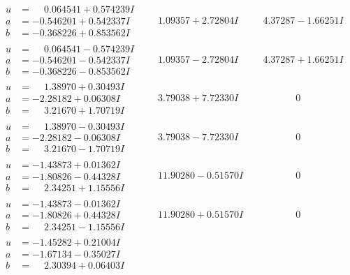 \documentclass[1p]{elsarticle_modified}
\theoremstyle{definition}
\begin{document}
$$\begin{array}{c|c|c}
\begin{aligned}
u &= \phantom{-}0.064541 + 0.574239 I \\
a &= -0.546201 + 0.542337 I \\
b &= -0.368226 + 0.853562 I\end{aligned}
 & \phantom{-}1.09357 + 2.72804 I & \phantom{-}4.37287 - 1.66251 I \\ \hline\begin{aligned}
u &= \phantom{-}0.064541 - 0.574239 I \\
a &= -0.546201 - 0.542337 I \\
b &= -0.368226 - 0.853562 I\end{aligned}
 & \phantom{-}1.09357 - 2.72804 I & \phantom{-}4.37287 + 1.66251 I \\ \hline\begin{aligned}
u &= \phantom{-}1.38970 + 0.30493 I \\
a &= -2.28182 + 0.06308 I \\
b &= \phantom{-}3.21670 + 1.70719 I\end{aligned}
 & \phantom{-}3.79038 + 7.72330 I & \phantom{-0.000000 } 0 \\ \hline\begin{aligned}
u &= \phantom{-}1.38970 - 0.30493 I \\
a &= -2.28182 - 0.06308 I \\
b &= \phantom{-}3.21670 - 1.70719 I\end{aligned}
 & \phantom{-}3.79038 - 7.72330 I & \phantom{-0.000000 } 0 \\ \hline\begin{aligned}
u &= -1.43873 + 0.01362 I \\
a &= -1.80826 - 0.44328 I \\
b &= \phantom{-}2.34251 + 1.15556 I\end{aligned}
 & \phantom{-}11.90280 - 0.51570 I & \phantom{-0.000000 } 0 \\ \hline\begin{aligned}
u &= -1.43873 - 0.01362 I \\
a &= -1.80826 + 0.44328 I \\
b &= \phantom{-}2.34251 - 1.15556 I\end{aligned}
 & \phantom{-}11.90280 + 0.51570 I & \phantom{-0.000000 } 0 \\ \hline\begin{aligned}
u &= -1.45282 + 0.21004 I \\
a &= -1.67134 - 0.35027 I \\
b &= \phantom{-}2.30394 + 0.06403 I\end{aligned}

\end{array}$$
\end{document}
